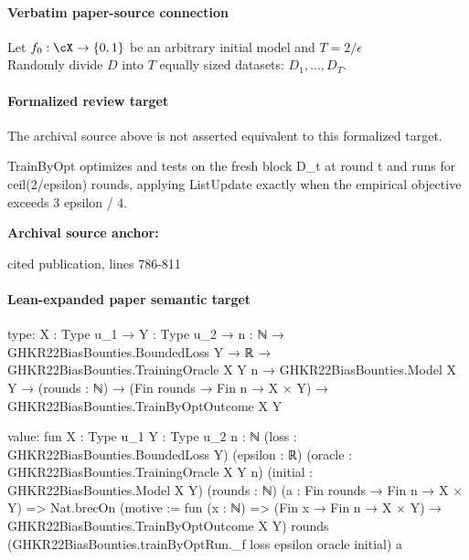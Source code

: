 \documentclass[10pt]{article}
\begin{document}
\paragraph{Verbatim paper-source connection}
\begin{ReviewVerbatim}
\begin{algorithm}
\ifdraft
\else
\small
\fi
{}
Let $f_0:\cX\rightarrow \{0,1\}$ be an arbitrary initial model and $T = 2/\epsilon$ \\

Randomly divide $D$ into $T$ equally sized datasets: $D_1,\ldots,D_T$.


\caption{TrainByOpt($D,\cC,\epsilon)$: An algorithm for training an $(\epsilon,\cC)$-Bayes optimal model given the ability to optimize over certificates $(g,h) \in \cC$.}
\label{alg:TrainByOpt}
\end{algorithm}
\end{ReviewVerbatim}


\paragraph{Formalized review target}
The archival source above is not asserted equivalent to this formalized target.
\begin{ReviewVerbatim}
TrainByOpt optimizes and tests on the fresh block D_t at round t and runs for ceil(2/epsilon) rounds, applying ListUpdate exactly when the empirical objective exceeds 3 epsilon / 4.
\end{ReviewVerbatim}

\textbf{Archival source anchor:} {\footnotesize\raggedright cited publication, lines 786-\allowbreak{}811\par}
\paragraph{Lean-expanded paper semantic target}
\begin{ReviewVerbatim}
type:
{X : Type u_1} →
  {Y : Type u_2} →
    {n : ℕ} →
      GHKR22BiasBounties.BoundedLoss Y →
        ℝ →
          GHKR22BiasBounties.TrainingOracle X Y n →
            GHKR22BiasBounties.Model X Y →
              (rounds : ℕ) → (Fin rounds → Fin n → X × Y) → GHKR22BiasBounties.TrainByOptOutcome X Y

value:
fun {X : Type u_1} {Y : Type u_2} {n : ℕ} (loss : GHKR22BiasBounties.BoundedLoss Y) (epsilon : ℝ)
    (oracle : GHKR22BiasBounties.TrainingOracle X Y n) (initial : GHKR22BiasBounties.Model X Y) (rounds : ℕ)
    (a : Fin rounds → Fin n → X × Y) =>
  Nat.brecOn (motive := fun (x : ℕ) => (Fin x → Fin n → X × Y) → GHKR22BiasBounties.TrainByOptOutcome X Y) rounds
    (GHKR22BiasBounties.trainByOptRun._f loss epsilon oracle initial) a
\end{ReviewVerbatim}
\end{document}
